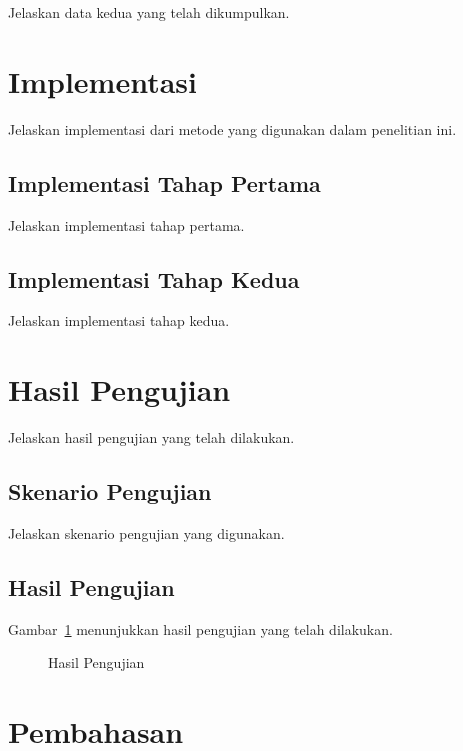 Jelaskan data kedua yang telah dikumpulkan.

\section{Implementasi}

Jelaskan implementasi dari metode yang digunakan dalam penelitian ini.

\subsection{Implementasi Tahap Pertama}

Jelaskan implementasi tahap pertama.

\subsection{Implementasi Tahap Kedua}

Jelaskan implementasi tahap kedua.

\section{Hasil Pengujian}

Jelaskan hasil pengujian yang telah dilakukan.

\subsection{Skenario Pengujian}

Jelaskan skenario pengujian yang digunakan.

\subsection{Hasil Pengujian}

Gambar~\ref{fig:hasil-pengujian} menunjukkan hasil pengujian yang telah dilakukan.

\begin{figure}[htbp]
    \centering
    \caption{Hasil Pengujian}
    \label{fig:hasil-pengujian}
\end{figure}

\section{Pembahasan}

